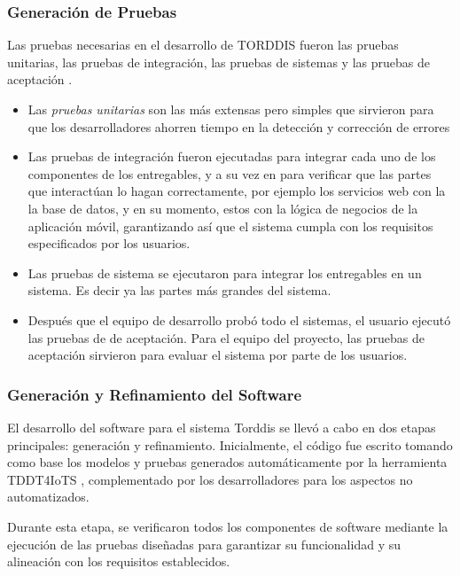 			\subsubsection{Generación de Pruebas}
				Las pruebas necesarias en el desarrollo de TORDDIS fueron las pruebas unitarias, las pruebas de integración, las pruebas de sistemas y las pruebas de aceptación \citep{Sciarra2024Smash}.
			
				\begin{itemize}
					\item Las \textit{pruebas unitarias} son las más extensas pero simples que sirvieron para que los desarrolladores ahorren tiempo en la detección y corrección de errores \citep{Mafi2024Regression}
					\item Las pruebas de integración fueron ejecutadas para integrar cada uno de los componentes de los entregables, y a su vez en para verificar que las partes que interactúan lo hagan correctamente, por ejemplo los servicios web con la la base de datos, y en su momento, estos con la lógica de negocios de la aplicación móvil, garantizando así que el sistema cumpla con los requisitos especificados por los usuarios.
					\item Las pruebas de sistema se ejecutaron para integrar los entregables en un sistema. Es decir ya las partes más grandes del sistema.
					\item Después que el equipo de desarrollo probó todo el sistemas, el usuario ejecutó las pruebas de de aceptación. Para el equipo del proyecto, las pruebas de aceptación sirvieron para evaluar el sistema por parte de los usuarios.
				\end{itemize}
			
			\subsubsection{Generación y Refinamiento del Software} 
				El desarrollo del software para el sistema Torddis se llevó a cabo en dos etapas principales: generación y refinamiento. Inicialmente, el código fue escrito tomando como base los modelos y pruebas generados automáticamente por la herramienta TDDT4IoTS \citep{Guerrero2024Test}, complementado por los desarrolladores para los aspectos no automatizados. 
			
				Durante esta etapa, se verificaron todos los componentes de software mediante la ejecución de las pruebas diseñadas para garantizar su funcionalidad y su alineación con los requisitos establecidos.
			
